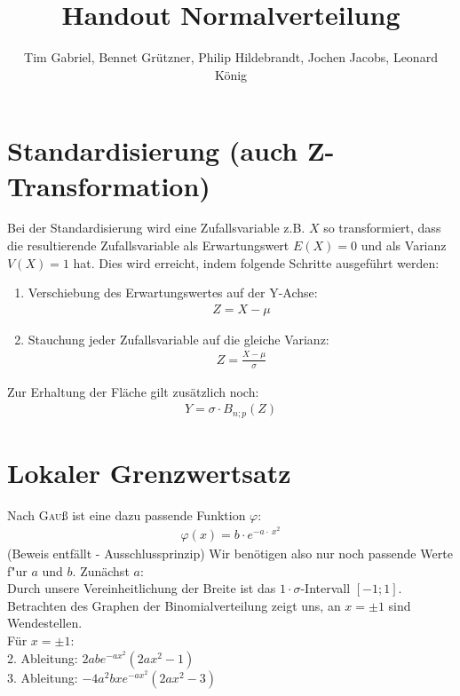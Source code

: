 \documentclass[12pt,a4paper,twocolumn]{article}
\author{Tim Gabriel, Bennet Grützner, Philip Hildebrandt, Jochen Jacobs, Leonard König}
\title{Handout Normalverteilung}
\begin{document}
\maketitle

\section{Standardisierung (auch Z-Transformation)}
Bei der Standardisierung wird eine Zufallsvariable z.B. $X$ so transformiert, dass die resultierende Zufallsvariable als Erwartungswert $E(X) = 0$ und als Varianz $V(X)=1$ hat. Dies wird erreicht, indem folgende Schritte ausgeführt werden:
\begin{enumerate}
\item Verschiebung des Erwartungswertes auf der Y-Achse:
\begin{eqnarray}
  Z = X - \mu
\end{eqnarray}
\item Stauchung jeder Zufallsvariable auf die gleiche Varianz:
\begin{eqnarray}
  Z = \frac{X - \mu}{\sigma}
\end{eqnarray}
\end{enumerate}
Zur Erhaltung der Fläche gilt zusätzlich noch:
\begin{eqnarray}
	Y = \sigma \cdot B_{n;p}(Z)
\end{eqnarray}



\section{Lokaler Grenzwertsatz}

Nach \textrm{\textsc{Gau}ß} ist eine dazu passende Funktion $\varphi$:
\begin{eqnarray}
\varphi(x)=b\cdot e^{-a\cdot\ x^2} \label{eq_gauss}
\end{eqnarray}
(Beweis entfällt \-- Ausschlussprinzip)
Wir benötigen also nur noch passende Werte f"ur $a$ und $b$. Zunächst $a$:\\ 

Durch unsere Vereinheitlichung der Breite ist das $1\cdot \sigma$-Intervall $[-1;1]$. Betrachten des Graphen der Binomialverteilung zeigt uns, an $x=\pm 1$ sind Wendestellen.\\
Für $x=\pm 1$:\\

2. Ableitung: $2abe^{-ax^2} (2ax^2-1)$\\
3. Ableitung: $-4 a^{2} b x e^{-a x^2}(2 a x^2 -3)$\\
\end{document}

